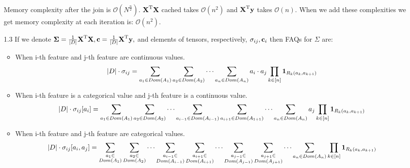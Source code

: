 \documentclass[10pt,a4paper]{article}
\begin{document}
\begin{enumerate}
Memory complexity after the join is
$\mathcal{O}(N^\frac{n}{2})$. $\textbf{\text{{X}}} ^ \text{T}\textbf{\text{{X}}}$ cached takes $\mathcal{O}(n^2)$ and $\textbf{\text{{X}}} ^ \text{T}\textbf{\text{{y}}}$ takes $\mathcal{O}(n)$.
When we add these complexities we get memory complexity at each iteration is:
$\mathcal{O}(n^2)$. 

\item[1.3]
If we denote $\mathbf{\Sigma} = \frac{1}{|D|}\textbf{\text{{X}}} ^ \text{T} \textbf{\text{{X}}}, \textbf{\text{{c}}} = \frac{1}{|D|}\textbf{\text{{X}}} ^ \text{T}\textbf{\text{{y}}}, $
and elements of tensors, respectively, $\mathbf{\sigma}_{ij}, \textbf{\text{{c}}}_{i}$ then FAQs for $\Sigma$ are: 
\begin{itemize}
\item When i-th feature and j-th feature are continuous values. 
$$|D| \cdot \mathbf{\sigma}_{ij}= \sum_{a_1 \in Dom(A_1)} \sum_{a_2 \in Dom(A_2)} \cdots \sum_{a_n \in Dom(A_n)} a_i \cdot a_j 
\prod_{k\in[n]} \textbf{\text{{1}}}_{R_k(a_k, a_{k+1})}$$
\item When i-th feature is a categorical value and j-th feature is a continuous value. 
$$|D| \cdot \mathbf{\sigma}_{ij}[a_i]= \sum_{a_1 \in Dom(A_1)} \sum_{a_2 \in Dom(A_2)} \cdots 
\sum_{a_{i-1} \in Dom(A_{i-1})}
\sum_{a_{i+1} \in Dom(A_{1+1})}
\cdots
\sum_{a_n \in Dom(A_n)}  a_j 
\prod_{k\in[n]} \textbf{\text{{1}}}_{R_k(a_k, a_{k+1})}$$
\item When i-th feature and j-th feature are categorical values. 
$$|D| \cdot \mathbf{\sigma}_{ij}[a_i, a_j]= 
\sum_{\substack{a_{1} \in \\Dom(A_{1})}}
\sum_{\substack{a_{2} \in \\Dom(A_{2})}}
\cdots 
\sum_{\substack{a_{i-1} \in \\Dom(A_{i-1})}}
\sum_{\substack{a_{i+1} \in \\Dom(A_{i+1})}}
\cdots
\sum_{\substack{a_{j-1} \in \\Dom(A_{j-1})}}
\sum_{\substack{a_{j+1} \in \\Dom(A_{j+1})}}
\cdots
\sum_{a_n \in Dom(A_n)}  
\prod_{k\in[n]} \textbf{\text{{1}}}_{R_k(a_k, a_{k+1})}$$


\end{itemize}
\end{enumerate}
\end{document}
